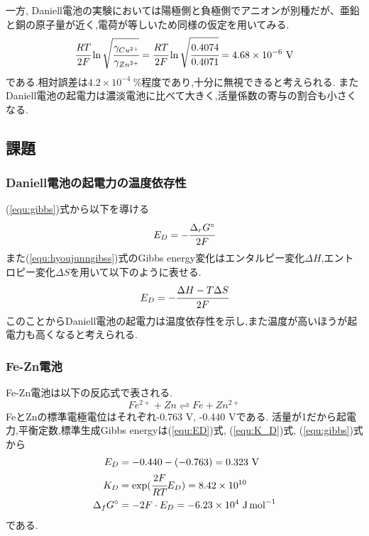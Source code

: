 
一方, Daniell電池の実験においては陽極側と負極側でアニオンが別種だが、亜鉛と銅の原子量が近く,電荷が等しいため同様の仮定を用いてみる.
\begin{equation*}
  \cfrac{RT}{2F} \ln \sqrt{\cfrac{\gamma_{Cu^{2+}}}{\gamma_{Zn^{2+}}}}=\cfrac{RT}{2F} \ln \sqrt{\cfrac{0.4074}{0.4071}}=4.68\times10^{-6}\ \si{\volt}
\end{equation*}
である.相対誤差は$4.2\times10^{-4}\ \%$程度であり,十分に無視できると考えられる.
またDaniell電池の起電力は濃淡電池に比べて大きく,活量係数の寄与の割合も小さくなる.
\subsection{課題}
\subsubsection{Daniell電池の起電力の温度依存性}
(\ref{equ:gibbs})式から以下を導ける
\begin{equation}
  \label{equ:hyoujunngibss}
  E_D=-\cfrac{\Delta_rG^{\circ}}{2F}
\end{equation}
また(\ref{equ:hyoujunngibss})式のGibbs energy変化はエンタルピー変化$\Delta H$,エントロピー変化$\Delta S$を用いて以下のように表せる\cite{jiten}.
\begin{equation}
  \label{equ:enen}
  E_D=-\cfrac{\Delta H - T\Delta S}{2F}
\end{equation}
このことからDaniell電池の起電力は温度依存性を示し,また温度が高いほうが起電力も高くなると考えられる.
\subsubsection{Fe-Zn電池}
Fe-Zn電池は以下の反応式で表される.
\begin{equation*}
  Fe^{2+}+Zn\rightleftharpoons Fe+Zn^{2+}
\end{equation*}
FeとZnの標準電極電位はそれぞれ-0.763 \si{\volt}, -0.440 \si{\volt}である.
活量が1だから起電力,平衡定数,標準生成Gibbs energyは(\ref{equ:ED})式, (\ref{equ:K_D})式, (\ref{equ:gibbs})式から
\begin{align*}
  E_D&=-0.440-(-0.763)=0.323\ \si{\volt}\\
  K_D&=\exp(\cfrac{2F}{RT}E_D)=8.42\times10^{10}\\
  \Delta_fG^{\circ}&=-2F\cdot E_D=-6.23\times10^4\ \si{\joule.\mole^{-1}}
\end{align*}
である.
